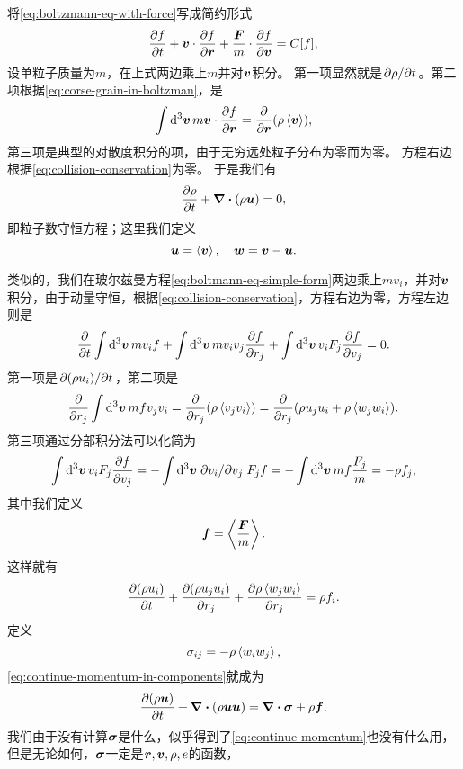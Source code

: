 将\eqref{eq:boltzmann-eq-with-force}写成简约形式
\begin{equation}
    \pdv{f}{t} + \vb*{v} \cdot \pdv{f}{\vb*{r}} + \frac{\vb*{F}}{m} \cdot \pdv{f}{\vb*{v}} = C[f],
    \label{eq:boltmann-eq-simple-form}
\end{equation}
设单粒子质量为$m$，在上式两边乘上$m$并对$\vb*{v}$积分。
第一项显然就是$\pdv*{\rho}{t}$。第二项根据\eqref{eq:corse-grain-in-boltzman}，是
\[
    \int \dd[3]{\vb*{v}} m \vb*{v} \cdot \pdv{f}{\vb*{r}} = \pdv{\vb*{r}} (\rho \expval{\vb*{v}}),
\]
第三项是典型的对散度积分的项，由于无穷远处粒子分布为零而为零。
方程右边根据\eqref{eq:collision-conservation}为零。
于是我们有
\begin{equation}
    \pdv{\rho}{t} + \div{(\rho \vb*{u})} = 0,
    \label{eq:continue-particle}
\end{equation}
即粒子数守恒方程；这里我们定义
\begin{equation}
    \vb*{u} = \expval{\vb*{v}}, \quad \vb*{w} = \vb*{v} - \vb*{u}.
    \label{eq:v-decomposite-u-w}
\end{equation}

类似的，我们在玻尔兹曼方程\eqref{eq:boltmann-eq-simple-form}两边乘上$m v_i$，并对$\vb*{v}$积分，由于动量守恒，根据\eqref{eq:collision-conservation}，方程右边为零，方程左边则是
\[
    \pdv{t} \int \dd[3]{\vb*{v}} m v_i f + \int \dd[3]{\vb*{v}} m v_i v_j \pdv{f}{r_j} + \int \dd[3]{\vb*{v}} v_i F_j \pdv{f}{v_j} = 0.
\]
第一项是$\pdv*{(\rho u_i)}{t}$，第二项是
\[
    \pdv{r_j} \int \dd[3]{\vb*{v}} mf v_j v_i = \pdv{r_j} (\rho \expval{v_j v_i}) = \pdv{r_j} (\rho u_j u_i + \rho \expval{w_j w_i}).
\]
第三项通过分部积分法可以化简为
\[
    \int \dd[3]{\vb*{v}} v_i F_j \pdv{f}{v_j} = - \int \dd[3]{\vb*{v}} \pdv*{v_i}{v_j} F_j f = - \int \dd[3]{\vb*{v}} m f \frac{F_j}{m} = - \rho f_j,
\]
其中我们定义
\begin{equation}
    \vb*{f} = \expval{\frac{\vb*{F}}{m}}.
\end{equation}
这样就有
\begin{equation}
    \pdv{(\rho u_i)}{t} + \pdv{(\rho u_j u_i)}{r_j} + \pdv{\rho \expval*{w_j w_i}}{r_j} = \rho f_i.
    \label{eq:continue-momentum-in-components}
\end{equation}
定义
\begin{equation}
    \sigma_{ij} = - \rho \expval*{w_i w_j},
\end{equation}
\eqref{eq:continue-momentum-in-components}就成为
\begin{equation}
    \pdv{(\rho \vb*{u})}{t} + \div{(\rho \vb*{u} \vb*{u})} = \div{\vb*{\sigma}} + \rho \vb*{f}.
    \label{eq:continue-momentum}
\end{equation}
我们由于没有计算$\vb*{\sigma}$是什么，似乎得到了\eqref{eq:continue-momentum}也没有什么用，但是无论如何，$\vb*{\sigma}$一定是$\vb*{r}, \vb*{v}, \rho, e$的函数，

